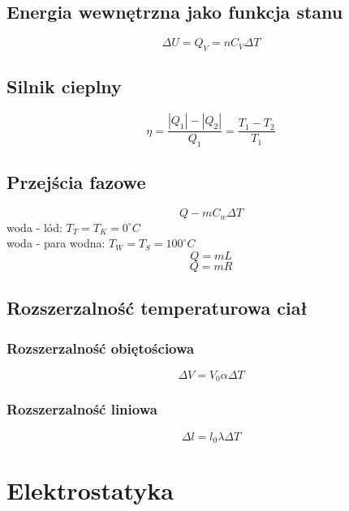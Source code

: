 \documentclass{article}
\numberwithin{equation}{section}
\begin{document}
    \subsection{Energia wewnętrzna jako funkcja stanu}
      \begin{equation}
        \Delta U = Q_V = nC_V\Delta T
      \end{equation}
    \subsection{Silnik cieplny}
      \begin{equation}
        \eta = \frac{|Q_1|-|Q_2|}{Q_1} = \frac{T_1 - T_2}{T_1}
      \end{equation}
    \subsection{Przejścia fazowe}
      \begin{equation}
        Q - mC_w\Delta T
      \end{equation}
      woda - lód: $T_T = T_K = 0^\circ C$\\
      woda - para wodna: $T_W = T_S = 100^\circ C$
      \begin{equation}
        Q = mL
      \end{equation}
      \begin{equation}
        Q = mR
      \end{equation}
    \subsection{Rozszerzalność temperaturowa ciał}
      \subsubsection{Rozszerzalność obiętościowa}
        \begin{equation}
          \Delta V = V_0\alpha\Delta T
        \end{equation}
      \subsubsection{Rozszerzalność liniowa}
        \begin{equation}
          \Delta l = l_0\lambda\Delta T
        \end{equation}

  \newpage
  \section{Elektrostatyka}
\end{document}
